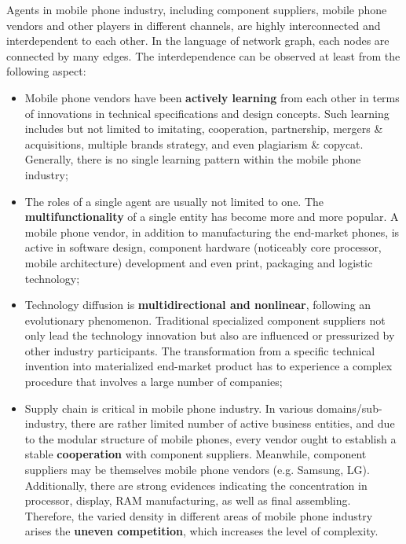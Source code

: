 \documentclass[utf8,english]{gradu3}
\begin{document}
Agents in mobile phone industry, including component suppliers, mobile phone vendors and other players in different channels, are highly interconnected and interdependent to each other. In the language of network graph, each nodes are connected by many edges. The interdependence can be observed at least from the following aspect:

\begin{itemize}
\item Mobile phone vendors have been \textbf{actively learning} from each other in terms of innovations in technical specifications and design concepts. Such learning includes but not limited to imitating, cooperation, partnership, mergers \& acquisitions, multiple brands strategy, and even plagiarism \& copycat. Generally, there is no single learning pattern within the mobile phone industry;
\item The roles of a single agent are usually not limited to one. The \textbf{multifunctionality} of a single entity has become more and more popular. A mobile phone vendor, in addition to manufacturing the end-market phones, is active in software design, component hardware (noticeably core processor, mobile architecture) development and even print, packaging and logistic technology;
\item Technology diffusion is \textbf{multidirectional and nonlinear}, following an evolutionary phenomenon. Traditional specialized component suppliers not only lead the technology innovation but also are influenced or pressurized by other industry participants. The transformation from a specific technical invention into materialized end-market product has to experience a complex procedure that involves a large number of companies;
\item Supply chain is critical in mobile phone industry. In various domains/sub-industry, there are rather limited number of active business entities, and due to the modular structure of mobile phones, every vendor ought to establish a stable \textbf{cooperation} with component suppliers. Meanwhile, component suppliers may be themselves mobile phone vendors (e.g. Samsung, LG). Additionally, there are strong evidences indicating the concentration in processor, display, RAM manufacturing, as well as final assembling. Therefore, the varied density in different areas of mobile phone industry arises the \textbf{uneven competition}, which increases the level of complexity.
\end{itemize}
\end{document}
